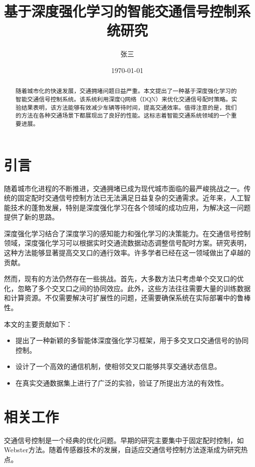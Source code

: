 \documentclass[12pt,a4paper]{article}
\title{基于深度强化学习的智能交通信号控制系统研究}
\author{张三}
\date{\today}
\begin{document}
\maketitle

\begin{abstract}
随着城市化的快速发展，交通拥堵问题日益严重。本文提出了一种基于深度强化学习的智能交通信号控制系统。该系统利用深度Q网络（DQN）来优化交通信号配时策略。实验结果表明，该方法能够有效减少车辆等待时间，提高交通效率。值得注意的是，我们的方法在各种交通场景下都展现出了良好的性能。这标志着智能交通系统领域的一个重要进展。
\end{abstract}

\section{引言}

随着城市化进程的不断推进，交通拥堵已成为现代城市面临的最严峻挑战之一。传统的固定配时交通信号控制方法已无法满足日益复杂的交通需求。近年来，人工智能技术的蓬勃发展，特别是深度强化学习在各个领域的成功应用，为解决这一问题提供了新的思路。

深度强化学习结合了深度学习的感知能力和强化学习的决策能力。在交通信号控制领域，深度强化学习可以根据实时交通流数据动态调整信号配时方案。研究表明，这种方法能够显著提高交叉口的通行效率。许多学者已经在这一领域做出了卓越的贡献。

然而，现有的方法仍然存在一些挑战。首先，大多数方法只考虑单个交叉口的优化，忽略了多个交叉口之间的协同效应。此外，这些方法往往需要大量的训练数据和计算资源。不仅需要解决可扩展性的问题，还需要确保系统在实际部署中的鲁棒性。

本文的主要贡献如下：
\begin{itemize}
    \item 提出了一种新颖的多智能体深度强化学习框架，用于多交叉口交通信号的协同控制。
    \item 设计了一个高效的通信机制，使相邻交叉口能够共享交通状态信息。
    \item 在真实交通数据集上进行了广泛的实验，验证了所提出方法的有效性。
\end{itemize}

\section{相关工作}

交通信号控制是一个经典的优化问题。早期的研究主要集中于固定配时控制，如Webster方法。随着传感器技术的发展，自适应交通信号控制方法逐渐成为研究热点。
\end{document}
